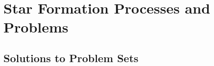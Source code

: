 \documentclass[twoside]{tex/tufte-book} %
\begin{document}







\part{Star Formation Processes and Problems}




















\appendix


\chapter{Solutions to Problem Sets}







\backmatter





\printindex %
\end{document}
